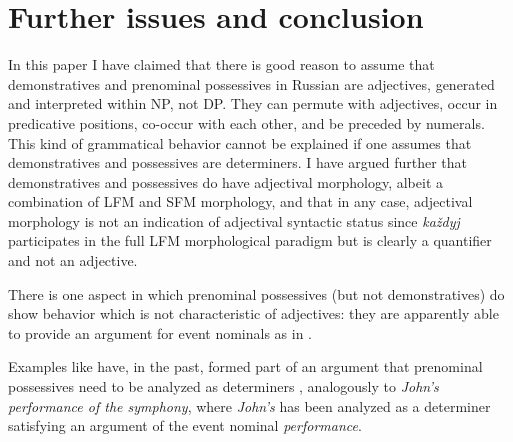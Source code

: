 \documentclass[output=paper]{langscibook}
\begin{document}
\section{Further issues and conclusion}\label{conclusion}

In this paper I have claimed that there is good reason to assume that demonstratives and prenominal possessives in Russian are adjectives, generated and interpreted within NP, not DP. They can permute with adjectives, occur in predicative positions, co-occur with each other, and be preceded by numerals. This kind of grammatical behavior cannot be explained if one assumes that demonstratives and possessives are determiners. I have argued further that demonstratives and possessives do have adjectival morphology, albeit a combination of LFM and SFM morphology, and that in any case, adjectival morphology is not an indication of adjectival syntactic status since \textit{každyj} participates in the full LFM morphological paradigm but is clearly a quantifier and not an adjective.  

There is one aspect in which prenominal possessives (but not demonstratives) do show behavior which is not characteristic of adjectives: they are apparently able to provide an argument for event nominals as in .


\ea\label{42_nedovoltstvo} 
\z\z

\noindent Examples like  have, in the past, formed part of an argument that prenominal possessives need to be analyzed as determiners  \citep[e.g.][]{Babyonyshev1997}, analogously to \textit{John’s performance of the symphony}, where \textit{John’s} has been analyzed as a determiner satisfying an argument of the event nominal \textit{performance}. 
\end{document}
